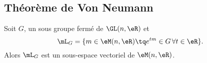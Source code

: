 \subsection{Théorème de Von Neumann}

\begin{lemma}
    Soit \( G\), un sous groupe fermé de \( \GL(n,\eR)\) et 
    \begin{equation}
        \mL_G=\{ m\in \eM(n,\eR)\tq  e^{tm}\in G\,\forall t\in\eR \}.
    \end{equation}
    Alors \( \mL_G\) est un sous-espace vectoriel de \( \eM(n,\eR)\).
\end{lemma}


